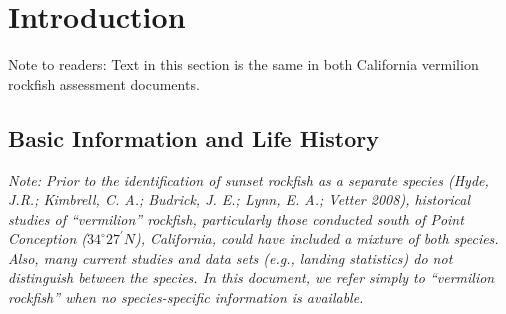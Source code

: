 \documentclass[11pt,
  english,
]{article}
\begin{document}

\hypertarget{introduction}{%
\section{Introduction}\label{introduction}}

\leavevmode\tagmcend\tagstructend

Note to readers: Text in this section is the same in both California vermilion rockfish assessment documents.


\hypertarget{basic-information-and-life-history}{%
\subsection{Basic Information and Life History}\label{basic-information-and-life-history}}

\leavevmode\tagmcend\tagstructend

\emph{Note: Prior to the identification of sunset rockfish as a separate species {(Hyde, J.R.; Kimbrell, C. A.; Budrick, J. E.; Lynn, E. A.; Vetter 2008)\leavevmode\tagmcend\tagstructend}, historical studies of ``vermilion'' rockfish, particularly those conducted south of Point Conception ($34^\circ 27^\prime N$), California, could have included a mixture of both species. Also, many current studies and data sets (e.g., landing statistics) do not distinguish between the species. In this document, we refer simply to ``vermilion rockfish'' when no species-specific information is available.}
\end{document}
